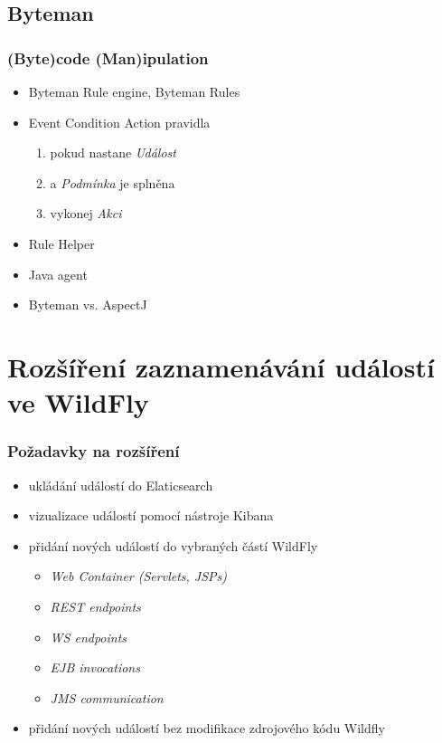 \documentclass{beamer}
\begin{document}
\subsection{Byteman}
\begin{frame}
	\frametitle{(\textbf{Byte})code (\textbf{Man})ipulation}
\begin{itemize}
	\item Byteman Rule engine, Byteman Rules
	\item Event Condition Action pravidla
	\begin{enumerate}
		\item pokud nastane \textit{Událost}
		\item a \textit{Podmínka} je splněna
		\item vykonej \textit{Akci}
	\end{enumerate}
	\item Rule Helper
	\item Java agent
	\item Byteman vs. AspectJ
\end{itemize}
\end{frame}

\section{Rozšíření zaznamenávání událostí ve WildFly}

\begin{frame}
	\frametitle{Požadavky na rozšíření}
	
	\begin{itemize}
		\item ukládání událostí do Elaticsearch
		\item vizualizace událostí pomocí nástroje Kibana
		\item přidání nových událostí do vybraných částí WildFly
		\begin{itemize}
			\item \textit{Web Container (Servlets, JSPs)}
			\item \textit{REST endpoints}
			\item \textit{WS endpoints}
			\item \textit{EJB invocations}
			\item \textit{JMS communication}
		\end{itemize}
		\item přidání nových událostí bez modifikace zdrojového kódu Wildfly
	\end{itemize}
\end{frame}
\end{document}
